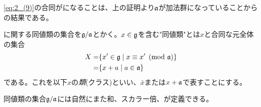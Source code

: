 \documentclass[../main]{subfiles}
\begin{document}
\begin{remark}
  \eqref{eq:2_(9)}の合同が{}になることは、上の証明より$\mathfrak{a}$が加法群になっていることからの結果である。
\end{remark}

\begin{definition}[類]\label{Def:class}
  {}に関する同値類の集合を$\mathfrak{g}/\mathfrak{a}$とかく。$x\in\mathfrak{g}$を含む"同値類"とは$x$と合同な元全体の集合
  \begin{align*}
    X=&\qty{x^{\prime}\in\mathfrak{g}\mid x\equiv x^{\prime} \pmod{\mathfrak{a}}} \\
    =& \qty{x+a\mid a\in\mathfrak{a}}
  \end{align*}
  である。これを以下$x$の\emph{類}(クラス)といい、$\bar{x}$または$x+\mathfrak{a}$で表すことにする。
\end{definition}


\begin{theorem}
  同値類の集合$\mathfrak{g}/\mathfrak{a}$には自然にまた和、スカラー倍、が定義できる。
\end{theorem}
\end{document}
